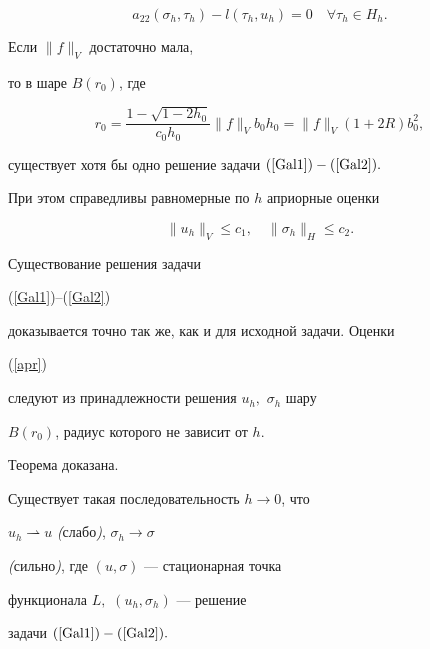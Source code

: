 %


\begin{equation}


\label{Gal2}


a_{22}(\sigma_h,\tau _h) - l(\tau _h, u_h ) = 0 \quad


\forall \tau _h \in H_h.


\end{equation}


\begin{thm}


Если $ \| f \| _V $ достаточно мала, 


то в шаре $B(r_{0})$, где


$$


r_0 =\frac{1 - \sqrt{1-2h_0}}{c_0 h_0}\|f\|_V b_0


h_0 = \|f\|_V (1 + 2R) b_0^2,


$$


существует хотя бы одно решение задачи $(\ref{Gal1}) - (\ref{Gal2}).$


При этом справедливы равномерные по $h$ априорные оценки


\begin{equation}


\label{apr}


\| u_h \| _V \le c_{1}, \quad 


\| \sigma_h \| _H \le c_{2}.


\end{equation}


\end{thm}





\begin{pf} Существование решения задачи 


(\ref{Gal1})--(\ref{Gal2}) 


доказывается точно так же, как и для исходной задачи. Оценки


(\ref{apr})


следуют из принадлежности решения $u_{h},$ $\sigma_h $ шару 


$B(r_{0})$, радиус которого не зависит от $h$. 


Теорема доказана.\end{pf}


\begin{thm}


Существует такая последовательность $h \to 0$, что


$u_h \rightharpoonup u $ {\em(}слабо{\em)}, $ \sigma_h \to \sigma $ 


{\em(}сильно{\em)}, где $(u, \sigma) $ --- стационарная точка


функционала $L,$ $ (u_h ,\sigma_h)$ --- решение 


задачи $(\ref{Gal1}) - (\ref{Gal2}).$


\end{thm} 






